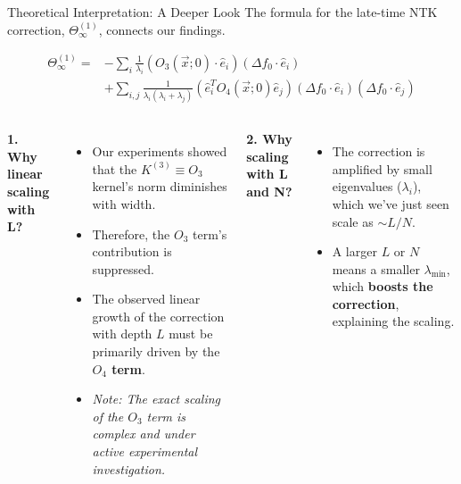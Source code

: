 \documentclass{beamer}
\begin{document}
\begin{frame}{Theoretical Interpretation: A Deeper Look}
The formula for the late-time NTK correction, $\Theta^{(1)}_\infty$, connects our findings.
\begin{theorem}
\begin{align*}
\Theta^{(1)}_\infty = & -\sum_{i}\frac{1}{\lambda_{i}}(O_{3}(\vec{x};0)\cdot\hat{e}_{i})(\Delta f_{0}\cdot\hat{e}_{i}) \\
& + \sum_{i,j}\frac{1}{\lambda_{i}(\lambda_{i}+\lambda_{j})}(\hat{e}_{i}^{T}O_{4}(\vec{x};0)\hat{e}_{j})(\Delta f_{0}\cdot \hat{e}_{i})(\Delta f_{0}\cdot \hat{e}_{j})
\end{align*}
\end{theorem}

\begin{columns}
\textbf{1. Why linear scaling with L?}
\begin{itemize}
    \item Our experiments showed that the $K^{(3)} \equiv O_3$ kernel's norm diminishes with width.
    \item Therefore, the $O_3$ term's contribution is suppressed.
    \item The observed linear growth of the correction with depth $L$ must be primarily driven by the \textbf{$O_4$ term}.
    \item \textit{Note: The exact scaling of the $O_3$ term is complex and under active experimental investigation.}
\end{itemize}

\textbf{2. Why scaling with L and N?}
\begin{itemize}
    \item The correction is amplified by small eigenvalues ($\lambda_i$), which we've just seen scale as $\sim L/N$.
    \item A larger $L$ or $N$ means a smaller $\lambda_{\min}$, which \textbf{boosts the correction}, explaining the scaling.
\end{itemize}
\end{columns}

\end{frame}
\end{document}
